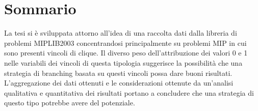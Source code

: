 \documentclass[12pt,a4paper,twoside,openright]{book}
\begin{document}
\tableofcontents
\listoffigures




\frontmatter

\chapter{Sommario}
La tesi si è sviluppata attorno all’idea di una raccolta dati
dalla libreria di problemi MIPLIB2003 concentrandosi principalmente
su problemi MIP in cui sono presenti vincoli di clique. 
Il diverso peso dell’attribuzione dei valori 0 e 1 nelle variabili dei vincoli di 
questa tipologia suggerisce la possibilità che una strategia di branching basata 
su questi vincoli possa dare buoni risultati.
\\L'aggregazione dei dati ottenuti e le considerazioni ottenute da un'analisi 
qualitativa e quantitativa dei risultati portano a concludere che una strategia
di questo tipo potrebbe avere del potenziale.
\end{document}
